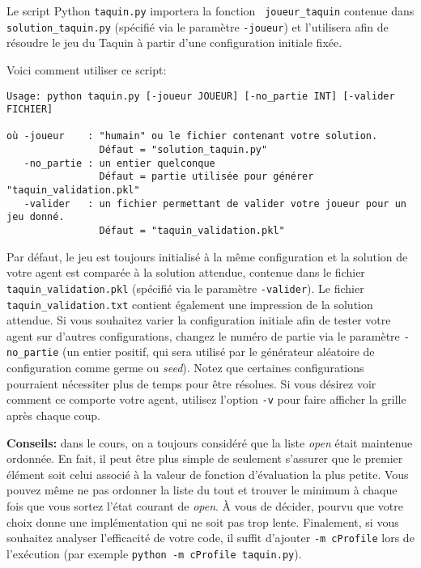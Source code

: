 \documentclass{article}
\begin{document}
\begin{enumerate}[itemsep=20pt]
  Le script Python {\tt taquin.py} importera la fonction {\tt
    joueur\_taquin} contenue dans {\tt solution\_taquin.py} (spécifié via le paramètre {\tt -joueur}) et l'utilisera afin de résoudre le jeu
  du Taquin à partir d'une configuration initiale fixée.


  Voici comment utiliser ce script:
\begin{verbatim}
Usage: python taquin.py [-joueur JOUEUR] [-no_partie INT] [-valider FICHIER]

où -joueur    : "humain" ou le fichier contenant votre solution.
                Défaut = "solution_taquin.py"
   -no_partie : un entier quelconque
                Défaut = partie utilisée pour générer "taquin_validation.pkl"
   -valider   : un fichier permettant de valider votre joueur pour un jeu donné.
                Défaut = "taquin_validation.pkl"

\end{verbatim}

  Par défaut, le jeu est toujours initialisé à la même configuration
  et la solution de votre agent est comparée à la solution attendue,
  contenue dans le fichier {\tt taquin\_validation.pkl} (spécifié via
  le paramètre {\tt -valider}). Le fichier {\tt
    taquin\_validation.txt} contient également une impression de la
  solution attendue. Si vous souhaitez varier la configuration
  initiale afin de tester votre agent sur d'autres configurations,
  changez le numéro de partie via le paramètre {\tt -no\_partie} (un entier
  positif, qui sera utilisé par le générateur aléatoire de
  configuration comme germe ou {\it seed}).  Notez que certaines
  configurations pourraient nécessiter plus de temps pour être
  résolues. Si vous désirez voir comment ce comporte votre agent, utilisez
  l'option {\tt -v} pour faire afficher la grille après chaque coup.

  {\bf Conseils:} dans le cours, on a toujours considéré que la liste
  {\it open} était maintenue ordonnée. En fait, il peut être plus
  simple de seulement s'assurer que le premier élément soit celui
  associé à la valeur de fonction d'évaluation la plus petite. Vous
  pouvez même ne pas ordonner la liste du tout et trouver le minimum
  à chaque fois que vous sortez l'état courant de {\it open}. À vous
  de décider, pourvu que votre choix donne une implémentation qui
  ne soit pas trop lente. Finalement, si vous souhaitez analyser
  l'efficacité de votre code, il suffit d'ajouter {\tt -m cProfile}
  lors de l'exécution (par exemple {\tt python -m cProfile taquin.py}).


\end{enumerate}
\end{document}
